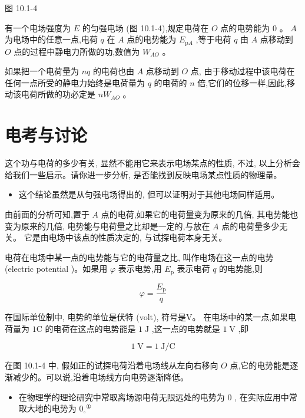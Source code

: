 \documentclass[10pt]{article}
\begin{document}
图 10.1-4

有一个电场强度为 \(E\) 的匀强电场 (图 10.1-4),规定电荷在 \(O\) 点的电势能为 \(0\) 。 \(A\) 为电场中的任意一点,电荷 \(q\) 在 \(A\) 点的电势能为 \({E}_{\mathrm{p}A}\) ,等于电荷 \(q\) 由 \(A\) 点移动到 \(O\) 点的过程中静电力所做的功,数值为 \({W}_{AO}\) 。

如果把一个电荷量为 \({nq}\) 的电荷也由 \(A\) 点移动到 \(O\) 点, 由于移动过程中该电荷在任何一点所受的静电力始终是电荷量为 \(q\) 的电荷的 \(n\) 倍,它们的位移一样,因此,移动该电荷所做的功必定是 \(n{W}_{AO}\) 。

\section*{电考与讨论}

这个功与电荷的多少有关, 显然不能用它来表示电场某点的性质, 不过, 以上分析会给我们一些启示。请你进一步分析, 是否能找到反映电场某点性质的物理量。

\begin{mdframed}

\begin{itemize}
\item 这个结论虽然是从匀强电场得出的, 但可以证明对于其他电场同样适用。
\end{itemize}

\end{mdframed}

由前面的分析可知,置于 \(A\) 点的电荷,如果它的电荷量变为原来的几倍, 其电势能也变为原来的几倍, 电势能与电荷量之比却是一定的,与放在 \(A\) 点的电荷量多少无关。 它是由电场中该点的性质决定的, 与试探电荷本身无关。

电荷在电场中某一点的电势能与它的电荷量之比, 叫作电场在这一点的电势 (electric potential )。如果用 \(\varphi\) 表示电势,用 \({E}_{\mathrm{p}}\) 表示电荷 \(q\) 的电势能,则

\[
\varphi = \frac{{E}_{\mathrm{p}}}{q}
\]

在国际单位制中, 电势的单位是伏特 (volt), 符号是V。 在电场中的某一点,如果电荷量为 \(1\mathrm{C}\) 的电荷在这点的电势能是 \(1\mathrm{\;J}\) ,这一点的电势就是 \(1\mathrm{\;V}\) ,即

\[
1\mathrm{\;V} = 1\mathrm{\;J}/\mathrm{C}
\]

在图 10.1-4 中, 假如正的试探电荷沿着电场线从左向右移向 \(O\) 点,它的电势能是逐渐减少的。可以说,沿着电场线方向电势逐渐降低。

\begin{mdframed}

\begin{itemize}
\item 在物理学的理论研究中常取离场源电荷无限远处的电势为 0 , 在实际应用中常取大地的电势为 \({0}_{ \circ }{}^{\text{①}}\)
\end{itemize}

\end{mdframed}
\end{document}
